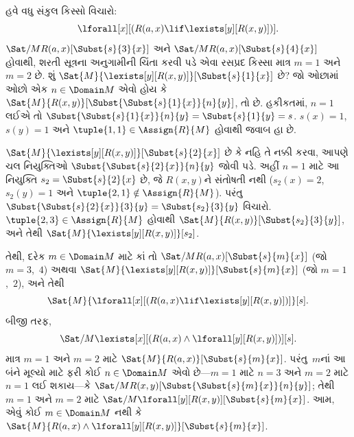 \begin{ex}
હવે વધુ સંકુલ કિસ્સો વિચારો:
\[
\lforall[x][(R(a,x) \lif \lexists[y][R(x,y)])].
\]
$\Sat/{M}{R(a,x)}[\Subst{s}{3}{x}]$ અને
$\Sat/{M}{R(a,x)}[\Subst{s}{4}{x}]$ હોવાથી, શરતી સૂત્રના અનુગામીની
ચિંતા કરવી પડે એવા રસપ્રદ કિસ્સા માત્ર $m=1$ અને $m=2$ છે. શું
$\Sat{M}{\lexists[y][R(x,y)]}[\Subst{s}{1}{x}]$ છે? જો ઓછામાં ઓછો એક
$n \in \Domain M$ એવો હોય કે
$\Sat{M}{R(x,y)}[\Subst{\Subst{s}{1}{x}}{n}{y}]$, તો છે. હકીકતમાં,
$n=1$ લઈએ તો $\Subst{\Subst{s}{1}{x}}{n}{y}=\Subst{s}{1}{y}=s$.
$s(x)=1$, $s(y)=1$ અને $\tuple{1,1}\in\Assign{R}{M}$ હોવાથી જવાબ હા
છે.

$\Sat{M}{\lexists[y][R(x,y)]}[\Subst{s}{2}{x}]$ છે કે નહિ તે નક્કી
કરવા, આપણે ચલ નિયુક્તિઓ
$\Subst{\Subst{s}{2}{x}}{n}{y}$ જોવી પડે. અહીં $n=1$ માટે આ નિયુક્તિ
$s_2=\Subst{s}{2}{x}$ છે, જે $R(x,y)$ને સંતોષતી નથી ($s_2(x)=2$,
$s_2(y)=1$ અને $\tuple{2,1}\notin\Assign{R}{M}$). પરંતુ
$\Subst{\Subst{s}{2}{x}}{3}{y}=\Subst{s_2}{3}{y}$ વિચારો.
$\tuple{2,3}\in\Assign{R}{M}$ હોવાથી
$\Sat{M}{R(x,y)}[\Subst{s_2}{3}{y}]$, અને તેથી
$\Sat{M}{\lexists[y][R(x,y)]}[s_2]$.

તેથી, દરેક $m \in \Domain M$ માટે કાં તો
$\Sat/{M}{R(a,x)}[\Subst{s}{m}{x}]$ (જો $m=3$,~$4$) અથવા
$\Sat{M}{\lexists[y][R(x,y)]}[\Subst{s}{m}{x}]$ (જો $m=1$,~$2$), અને તેથી
\[
\Sat{M}{\lforall[x][(R(a,x) \lif \lexists[y][R(x,y)])]}[s].
\]
બીજી તરફ,
\[
\Sat/{M}{\lexists[x][(R(a,x) \land \lforall[y][R(x,y)])]}[s].
\]
માત્ર $m=1$ અને $m=2$ માટે
$\Sat{M}{R(a,x)}[\Subst{s}{m}{x}]$. પરંતુ~$m$નાં આ બંને મૂલ્યો માટે
ફરી કોઈ $n \in \Domain M$ એવો છે---$m=1$ માટે $n=3$ અને $m=2$ માટે
$n=1$ લઈ શકાય---કે
$\Sat/{M}{R(x,y)}[\Subst{\Subst{s}{m}{x}}{n}{y}]$; તેથી $m=1$ અને
$m=2$ માટે $\Sat/{M}{\lforall[y][R(x,y)]}[\Subst{s}{m}{x}]$. આમ, એવું
કોઈ $m \in \Domain M$ નથી કે
$\Sat{M}{R(a,x) \land \lforall[y][R(x,y)]}[\Subst{s}{m}{x}]$.
\end{ex}









